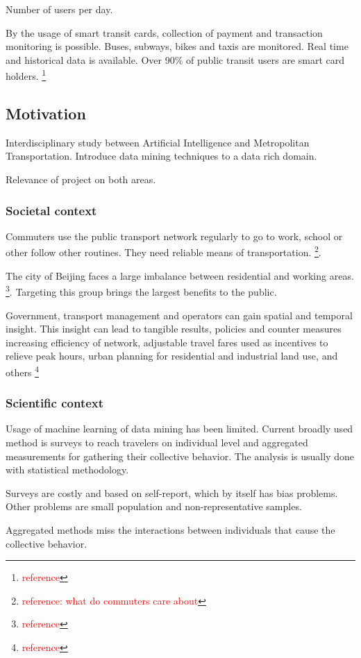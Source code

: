 \documentclass{article}
\newcommand{\selfnote}[1]{\footnote{\textcolor{red}{#1}}}
\begin{document}
Number of users per day.

By the usage of smart transit cards, collection of payment and transaction monitoring is possible. Buses, subways, bikes and taxis are monitored. Real time and historical data is available. Over 90\% of public transit users are smart card holders. \selfnote{reference}

\subsection{Motivation}
Interdisciplinary study between Artificial Intelligence and Metropolitan Transportation. Introduce data mining techniques to a data rich domain. 

Relevance of project on both areas. 

\subsubsection{Societal context}
Commuters use the public transport network regularly to go to work, school or other follow other routines. They need reliable means of transportation. \selfnote{reference: what do commuters care about}.

The city of Beijing faces a large imbalance between residential and working areas. \selfnote{reference}. Targeting this group brings the largest benefits to the public.  

Government, transport management and operators can gain spatial and temporal insight. This insight can lead to tangible results, policies and counter measures increasing efficiency of network, adjustable travel fares used as incentives to relieve peak hours, urban planning for residential and industrial land use, and others \selfnote{reference}

\subsubsection{Scientific context}
Usage of machine learning of data mining has been limited. Current broadly used method is surveys to reach travelers on individual level and aggregated measurements for gathering  their collective behavior. The analysis is usually done with statistical methodology. 

Surveys are costly and based on self-report, which by itself has bias problems. Other problems are small population and non-representative samples. 

Aggregated methods miss the interactions between individuals that cause the collective behavior. 
\end{document}
